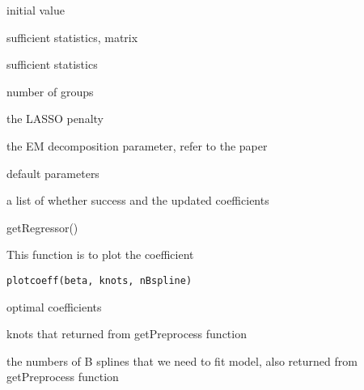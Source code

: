 \documentclass[a4paper]{book}
\begin{document}
%
\begin{Arguments}
\begin{ldescription}
\item[\code{beta\_init}] initial value

\item[\code{A}] sufficient statistics, matrix

\item[\code{B}] sufficient statistics

\item[\code{ngroup}] number of groups

\item[\code{lambda}] the LASSO penalty

\item[\code{alpha2}] the EM decomposition parameter, refer to the paper

\item[\code{...}] default parameters
\end{ldescription}
\end{Arguments}
%
\begin{Value}
a list of whether success and the updated coefficients
\end{Value}
%
\begin{Examples}
\begin{ExampleCode}
getRegressor()
\end{ExampleCode}
\end{Examples}
%
\begin{Description}\relax
This function is to plot the coefficient
\end{Description}
%
\begin{Usage}
\begin{verbatim}
plotcoeff(beta, knots, nBspline)
\end{verbatim}
\end{Usage}
%
\begin{Arguments}
\begin{ldescription}
\item[\code{beta}] optimal coefficients

\item[\code{knots}] knots that returned from getPreprocess function

\item[\code{nBspline}] the numbers of B splines that we need to fit model, also returned from getPreprocess function
\end{ldescription}
\end{Arguments}
\end{document}
